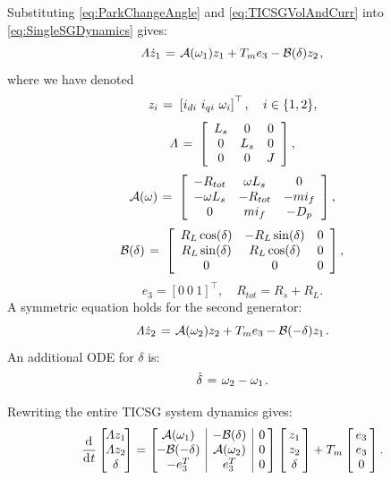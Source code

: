 \documentclass[letterpaper, 10 pt, conference]{ieeeconf}
\renewcommand{\o}    {{\omega}}
\newcommand{\m}      {{\hbox{\hskip 1pt}}}
\newcommand{\nm}     {{\hbox{\hskip -3pt}}}
\newcommand{\dd}     {{\rm d\hbox{\hskip 0.5pt}}}
\begin{document}
Substituting \eqref{eq:ParkChangeAngle} and \eqref{eq:TICSGVolAndCurr}
into \eqref{eq:SingleSGDynamics} gives:
$$ \varLambda\dot{z}_1 \m=\m \mathcal{A}(\o_1)z_1+T_m e_3 - 
   \mathcal{B}(\delta)z_2 \m,$$
where we have denoted
$$ z_i \m=\m \left[i_{di}\ i_{qi}\ \o_i\right]^\top,\quad 
   i\in\{1,2\},$$
$$ \varLambda \m=\m \left[\begin{array}{ccc} L_s & 0 & 0\\
   0 & L_{s} & 0\\ 0 & 0 & J \end{array}\right],$$
$$ \mathcal{A}(\o) \m=\m \left[\begin{array}{ccc}
   -R_{tot} & \o L_s & 0\\ -\o L_s & -R_{tot} & -mi_{f}\\
   0 & mi_{f} & -D_{p} \end{array}\right],$$
$$ \mathcal{B}(\delta) \m=\m \left[\begin{array}{ccc}
   R_L\cos(\delta) & -R_{L}\sin(\delta) & 0\\ R_L\sin(\delta) & 
   R_L\cos(\delta) & 0\\ 0 & 0 & 0 \end{array}\right],$$
$$e_{3}=\left[0\ 0\ 1\right]^\top, \quad  R_{tot}=R_{s}+R_{L}.$$
A symmetric equation holds for the second generator:
$$ \varLambda\dot{z}_2 \m=\m \mathcal{A}(\o_{2})z_{2}+T_{m}e_{3} -
   \mathcal{B}(-\delta)z_{1} \m.$$
An additional ODE for $\delta$ is:
$$\dot{\delta} \m=\m \o_2-\o_1 \m.$$

Rewriting the entire TICSG system dynamics gives:
\begin{equation} \label{eq:TICSGDynamics}
   \frac{\dd}{\dd t}\left[\nm\nm\begin{array}{c} \varLambda z_{1}\\
   \varLambda z_{2}\\ \delta \end{array}\nm\nm\right] = \left[\nm
   \nm\begin{array}{c|c|c} \mathcal{A}(\o_1) & -\mathcal{B}(\delta)
   & 0\\ -\mathcal{B}(-\delta) & \mathcal{A}(\o_2) & 0\\ -e_{3}^T
   & e_3^T & 0 \end{array}\nm\right] \left[\nm\begin{array}{c} z_1
   \\ z_2\\ \delta \end{array}\nm\right] + T_m \left[\nm 
   \begin{array}{c} e_{3}\\ e_{3}\\ 0 \end{array} \nm\right].
\end{equation}
\end{document}
